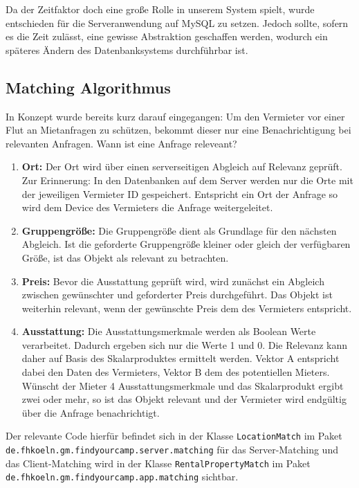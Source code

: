 Da der Zeitfaktor doch eine große Rolle in unserem System spielt, wurde entschieden für die Serveranwendung auf MySQL zu setzen. Jedoch sollte, sofern es die Zeit zulässt, eine gewisse Abstraktion geschaffen werden, wodurch ein späteres Ändern des Datenbanksystems durchführbar ist.

\subsection{Matching Algorithmus}

In Konzept wurde bereits kurz darauf eingegangen: Um den Vermieter vor einer Flut an Mietanfragen zu schützen, bekommt dieser nur eine Benachrichtigung bei relevanten Anfragen. Wann ist eine Anfrage releveant?

\begin{enumerate}
	\item \textbf{Ort:} Der Ort wird über einen serverseitigen Abgleich auf Relevanz geprüft. Zur Erinnerung: In den Datenbanken auf dem Server werden nur die Orte mit der jeweiligen Vermieter ID gespeichert. Entspricht ein Ort der Anfrage so wird dem Device des Vermieters die Anfrage weitergeleitet.
	\item \textbf{Gruppengröße:} Die Gruppengröße dient als Grundlage für den nächsten Abgleich. Ist die geforderte Gruppengröße kleiner oder gleich der verfügbaren Größe, ist das Objekt als relevant zu betrachten.
	\item \textbf{Preis:} Bevor die Ausstattung geprüft wird, wird zunächst ein Abgleich zwischen gewünschter und geforderter Preis durchgeführt. Das Objekt ist weiterhin relevant, wenn der gewünschte Preis dem des Vermieters entspricht.
	\item \textbf{Ausstattung:} Die Ausstattungsmerkmale werden als Boolean Werte verarbeitet. Dadurch ergeben sich nur die Werte 1 und 0.
	Die Relevanz kann daher auf Basis des Skalarproduktes ermittelt werden. Vektor A entspricht dabei den Daten des Vermieters, Vektor B dem des potentiellen Mieters. Wünscht der Mieter 4 Ausstattungsmerkmale und das Skalarprodukt ergibt zwei oder mehr, so ist das Objekt relevant und der Vermieter wird endgültig über die Anfrage benachrichtigt.
\end{enumerate}

Der relevante Code hierfür befindet sich in der Klasse \texttt{LocationMatch} im Paket \texttt{de.fhkoeln.gm.findyourcamp.server.matching} für das Server-Matching und das Client-Matching wird in der Klasse \texttt{RentalPropertyMatch} im Paket \texttt{de.fhkoeln.gm.findyourcamp.app.matching} sichtbar.

